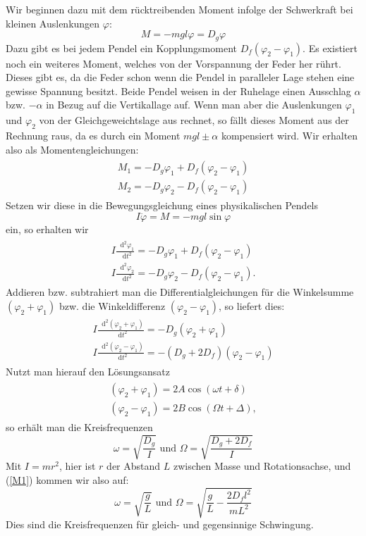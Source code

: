 \documentclass[11pt,a4paper]{article}
\newcommand\dif{\mathop{}\!\mathrm{d}}
\newcommand\vphi{\varphi}
\begin{document}
Wir beginnen dazu mit dem r\"ucktreibenden Moment infolge der Schwerkraft bei kleinen Auslenkungen $\vphi$:
\begin{equation}
M=-mgl\vphi=D_g\vphi\label{M1}
\end{equation}
Dazu gibt es bei jedem Pendel ein Kopplungsmoment $D_f(\vphi_2-\vphi_1)$. Es existiert noch ein weiteres Moment, welches von der Vorspannung der Feder her r\"uhrt. Dieses gibt es, da die Feder schon wenn die Pendel in paralleler Lage stehen eine gewisse Spannung besitzt. Beide Pendel weisen in der Ruhelage einen Ausschlag $\alpha$ bzw. $-\alpha$ in Bezug auf die Vertikallage auf. Wenn man aber die Auslenkungen $\vphi_1$ und $\vphi_2$ von der Gleichgeweichtslage aus rechnet, so f\"allt dieses Moment aus der Rechnung raus, da es durch ein Moment $mgl\pm\alpha$ kompensiert wird. Wir erhalten also als Momentengleichungen:
\begin{align}
\begin{split}
{M_1=-D_g\vphi_1+D_f(\vphi_2-\vphi_1)}
\\
{M_2=-D_g\vphi_2-D_f(\vphi_2-\vphi_1)}
\end{split}
\end{align}
Setzen wir diese in die Bewegungsgleichung eines physikalischen Pendels 
\[
I\ddot{\vphi}=M=-mgl\sin\vphi
\]
ein, so erhalten wir 
\begin{align}
\begin{split}
{I\frac{\dif^2\vphi_1}{\dif t^2}=-D_g\vphi_1+D_f(\vphi_2-\vphi_1)}
\\
{I\frac{\dif^2\vphi_2}{\dif t^2}=-D_g\vphi_2-D_f(\vphi_2-\vphi_1).}
\end{split}
\end{align}
Addieren bzw. subtrahiert man die Differentialgleichungen f\"ur die Winkelsumme $(\vphi_2+\vphi_1)$ bzw. die Winkeldifferenz $(\vphi_2-\vphi_1)$, so liefert dies:
\begin{align}
\begin{split}
{I\frac{\dif^2(\vphi_2+\vphi_1)}{\dif t^2}=-D_g(\vphi_2+\vphi_1)}\\
{I\frac{\dif^2(\vphi_2-\vphi_1)}{\dif t^2}=-(D_g+2D_f)(\vphi_2-\vphi_1)}
\end{split}
\end{align}
Nutzt man hierauf den L\"osungsansatz
\begin{align}
\begin{split}
{(\vphi_2+\vphi_1)=2A\cos(\omega t+\delta)}\\
{(\vphi_2-\vphi_1)=2B\cos(\Omega t+\Delta),}
\end{split}
\end{align}
so erh\"alt man die Kreisfrequenzen
\begin{equation}
\omega=\sqrt{\frac{D_g}{I}}\textrm{   und   }\Omega=\sqrt{\frac{D_g+2D_f}{I}}
\end{equation}
Mit $I=mr^2$, hier ist $r$ der Abstand $L$ zwischen Masse und Rotationsachse, und (\ref{M1}) kommen wir also auf:
\begin{equation}
\omega=\sqrt{\frac{g}{L}}\textrm{   und   }\Omega=\sqrt{\frac{g}{L}-\frac{2D_fl^2}{mL^2}}
\end{equation}
Dies sind die Kreisfrequenzen f\"ur gleich- und gegensinnige Schwingung.
\end{document}
